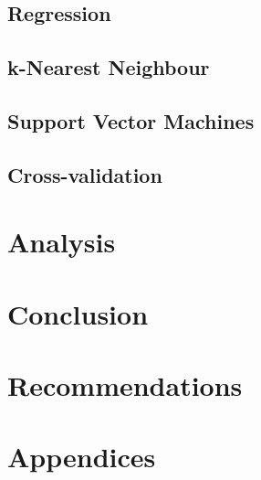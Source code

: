 \documentclass[10pt,a4paper]{article}
\begin{document}
\subsection{Regression}

\subsection{k-Nearest Neighbour}

\subsection{Support Vector Machines}

\subsection{Cross-validation}

\section{Analysis}

\section{Conclusion}

\section{Recommendations}



\section{Appendices}
\end{document}
